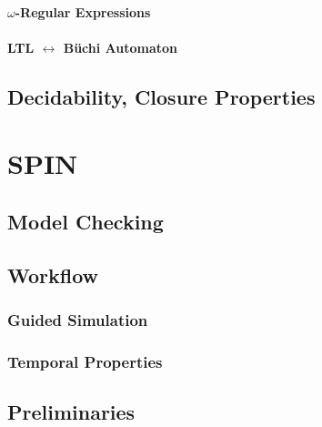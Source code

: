 \documentclass[a4paper, 11pt, accentcolor = tud3b]{tudreport}
\begin{document}
                \subsubsection{\(\omega\)-Regular Expressions} %

                \subsubsection{LTL \(\leftrightarrow\) Büchi Automaton} %

        \section{Decidability, Closure Properties} %

    \chapter{SPIN} %

        \section{Model Checking} %

        \section{Workflow} %

            \subsection{Guided Simulation} %

            \subsection{Temporal Properties} %

        \section{Preliminaries} %
\end{document}
